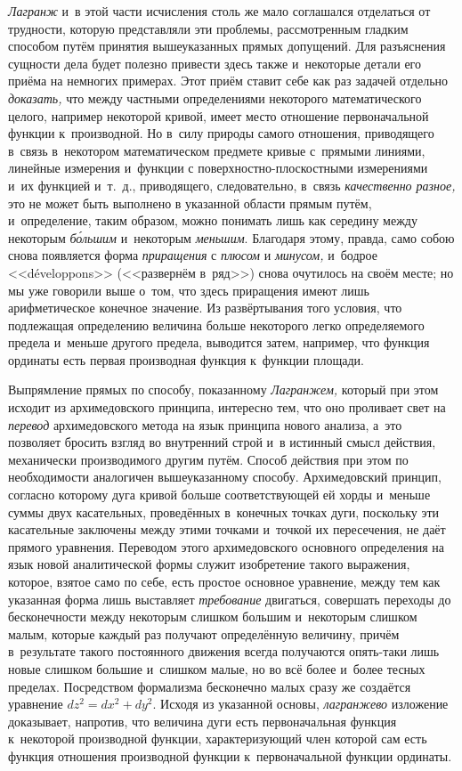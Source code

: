 {\em Лагранж} и~в этой части исчисления столь же мало соглашался отделаться от
трудности, которую представляли эти проблемы, рассмотренным гладким способом
путём принятия вышеуказанных прямых допущений. Для разъяснения сущности дела
будет полезно привести здесь также и~некоторые детали его приёма на немногих
примерах. Этот приём ставит себе как раз задачей отдельно {\em доказать,} что
между частными определениями некоторого математического целого, например
некоторой кривой, имеет место отношение первоначальной функции к~производной.
Но в~силу природы самого отношения, приводящего в~связь в~некотором
математическом предмете кривые с~прямыми линиями, линейные измерения и~функции
с поверхностно-плоскостными измерениями и~их функцией и~т.~д., приводящего,
следовательно, в~связь {\em качественно разное,} это не может быть выполнено в
указанной области прямым путём, и~определение, таким образом, можно понимать
лишь как середину между некоторым {\em б\'{о}льшим} и~некоторым {\em меньшим}.
Благодаря этому, правда, само собою снова появляется форма {\em приращения} с
{\em плюсом} и {\em минусом,} и~бодрое <<développons>> (<<развернём в~ряд>>)
снова очутилось на своём месте; но мы уже говорили выше о~том, что здесь
приращения имеют лишь арифметическое конечное значение. Из развёртывания того
условия, что подлежащая определению величина больше некоторого легко
определяемого предела и~меньше другого предела, выводится затем, например, что
функция ординаты есть первая производная функция к~функции площади.

Выпрямление прямых по способу, показанному {\em Лагранжем,} который при этом
исходит из архимедовского принципа, интересно тем, что оно проливает свет на
{\em перевод} архимедовского метода на язык принципа нового анализа, а~это
позволяет бросить взгляд во внутренний строй и~в истинный смысл действия,
механически производимого другим путём. Способ действия при этом по
необходимости аналогичен вышеуказанному способу. Архимедовский принцип,
согласно которому дуга кривой больше соответствующей ей хорды и~меньше суммы
двух касательных, проведённых в~конечных точках дуги, поскольку эти касательные
заключены между этими точками и~точкой их пересечения, не даёт прямого
уравнения. Переводом этого архимедовского основного определения на язык новой
аналитической формы служит изобретение такого выражения, которое, взятое само
по себе, есть простое основное уравнение, между тем как указанная форма лишь
выставляет {\em требование} двигаться, совершать переходы до бесконечности
между некоторым слишком большим и~некоторым слишком малым, которые каждый раз
получают определённую величину, причём в~результате такого постоянного движения
всегда получаются опять-таки лишь новые слишком большие и~слишком малые, но во
всё более и~более тесных пределах. Посредством формализма бесконечно малых
сразу же создаётся уравнение $dz^2=dx^2+dy^2$. Исходя из указанной основы,
{\em лагранжево} изложение доказывает, напротив, что величина дуги есть
первоначальная функция к~некоторой производной функции, характеризующий член
которой сам есть функция отношения производной функции к~первоначальной функции
ординаты.

